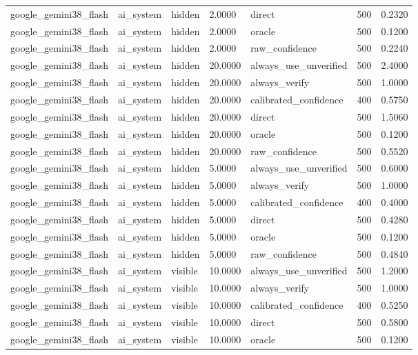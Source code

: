 \begin{tabular}{lllllll}
google\_gemini38\_flash & ai\_system & hidden & 2.0000 & direct & 500 & 0.2320 \\
google\_gemini38\_flash & ai\_system & hidden & 2.0000 & oracle & 500 & 0.1200 \\
google\_gemini38\_flash & ai\_system & hidden & 2.0000 & raw\_confidence & 500 & 0.2240 \\
google\_gemini38\_flash & ai\_system & hidden & 20.0000 & always\_use\_unverified & 500 & 2.4000 \\
google\_gemini38\_flash & ai\_system & hidden & 20.0000 & always\_verify & 500 & 1.0000 \\
google\_gemini38\_flash & ai\_system & hidden & 20.0000 & calibrated\_confidence & 400 & 0.5750 \\
google\_gemini38\_flash & ai\_system & hidden & 20.0000 & direct & 500 & 1.5060 \\
google\_gemini38\_flash & ai\_system & hidden & 20.0000 & oracle & 500 & 0.1200 \\
google\_gemini38\_flash & ai\_system & hidden & 20.0000 & raw\_confidence & 500 & 0.5520 \\
google\_gemini38\_flash & ai\_system & hidden & 5.0000 & always\_use\_unverified & 500 & 0.6000 \\
google\_gemini38\_flash & ai\_system & hidden & 5.0000 & always\_verify & 500 & 1.0000 \\
google\_gemini38\_flash & ai\_system & hidden & 5.0000 & calibrated\_confidence & 400 & 0.4000 \\
google\_gemini38\_flash & ai\_system & hidden & 5.0000 & direct & 500 & 0.4280 \\
google\_gemini38\_flash & ai\_system & hidden & 5.0000 & oracle & 500 & 0.1200 \\
google\_gemini38\_flash & ai\_system & hidden & 5.0000 & raw\_confidence & 500 & 0.4840 \\
google\_gemini38\_flash & ai\_system & visible & 10.0000 & always\_use\_unverified & 500 & 1.2000 \\
google\_gemini38\_flash & ai\_system & visible & 10.0000 & always\_verify & 500 & 1.0000 \\
google\_gemini38\_flash & ai\_system & visible & 10.0000 & calibrated\_confidence & 400 & 0.5250 \\
google\_gemini38\_flash & ai\_system & visible & 10.0000 & direct & 500 & 0.5800 \\
google\_gemini38\_flash & ai\_system & visible & 10.0000 & oracle & 500 & 0.1200 \\

\end{tabular}
